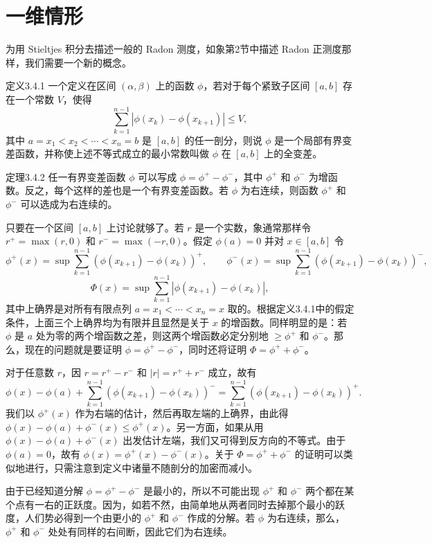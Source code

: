 \section{一维情形}
为用 Stieltjes 积分去描述一般的 Radon 测度，如象第2节中描述 Radon 正测度那样，我们需要一个新的概念。
\begin{statement}{定义}{3.4.1}
一个定义在区间 $(\alpha,\beta)$ 上的函数 $\phi$，若对于每个紧致子区间 $[a,b]$ 存在一个常数 $V$，使得
\[\sum_{k=1}^{n-1}|\phi(x_k)-\phi(x_{k+1})|\le V,\]
其中 $a=x_1<x_2<\cdots<x_n=b$ 是 $[a,b]$ 的任一剖分，则说 $\phi$ 是一个局部有界变差函数，并称使上述不等式成立的最小常数叫做 $\phi$ 在 $[a,b]$ 上的全变差。
\end{statement}
\begin{statement}{定理}{3.4.2}
任一有界变差函数 $\phi$ 可以写成 $\phi=\phi^+-\phi^-$，其中 $\phi^+$ 和 $\phi^-$ 为增函数。反之，每个这样的差也是一个有界变差函数。若 $\phi$ 为右连续，则函数 $\phi^+$ 和 $\phi^-$ 可以选成为右连续的。
\end{statement}
\Proof 只要在一个区间 $[a,b]$ 上讨论就够了。若 $r$ 是一个实数，象通常那样令 $r^+=\max(r,0)$ 和 $r^-=\max(-r,0)$。假定 $\phi(a)=0$ 并对 $x\in[a,b]$ 令
\[\phi^+(x)=\sup\sum_{k=1}^{n-1}(\phi(x_{k+1})-\phi(x_k))^+,\qquad\phi^-(x)=\sup\sum_{k=1}^{n-1}(\phi(x_{k+1})-\phi(x_k))^-,\]
\[\Phi(x)=\sup\sum_{k=1}^{n-1}|\phi(x_{k+1})-\phi(x_k)|,\]
其中上确界是对所有有限点列 $a=x_1<\cdots<x_n=x$ 取的。根据定义3.4.1中的假定条件，上面三个上确界均为有限并且显然是关于 $x$ 的增函数。同样明显的是：若 $\phi$ 是 $a$ 处为零的两个增函数之差，则这两个增函数必定分别地 $\ge\phi^+$ 和 $\phi^-$。那么，现在的问题就是要证明 $\phi=\phi^+-\phi^-$，同时还将证明 $\Phi=\phi^++\phi^-$。

对于任意数 $r$，因 $r=r^+-r^-$ 和 $|r|=r^++r^-$ 成立，故有
\[\phi(x)-\phi(a)+\sum_{k=1}^{n-1}(\phi(x_{k+1})-\phi(x_k))^-=\sum_{k=1}^{n-1}(\phi(x_{k+1})-\phi(x_k))^+.\]
我们以 $\phi^+(x)$ 作为右端的估计，然后再取左端的上确界，由此得 $\phi(x)-\phi(a)+\phi^-(x)\le\phi^+(x)$。另一方面，如果从用 $\phi(x)-\phi(a)+\phi^-(x)$ 出发估计左端，我们又可得到反方向的不等式。由于 $\phi(a)=0$，故有 $\phi(x)=\phi^+(x)-\phi^-(x)$。关于 $\Phi=\phi^++\phi^-$ 的证明可以类似地进行，只需注意到定义中诸量不随剖分的加密而减小。

由于已经知道分解 $\phi=\phi^+-\phi^-$ 是最小的，所以不可能出现 $\phi^+$ 和 $\phi^-$ 两个都在某个点有一右的正跃度。因为，如若不然，由简单地从两者同时去掉那个最小的跃度，人们势必得到一个由更小的 $\phi^+$ 和 $\phi^-$ 作成的分解。若 $\phi$ 为右连续，那么，$\phi^+$ 和 $\phi^-$ 处处有同样的右间断，因此它们为右连续。

